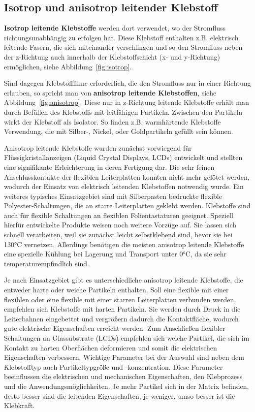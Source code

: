 \subsection{Isotrop und anisotrop leitender Klebstoff}

{\bf Isotrop leitende Klebstoffe} werden dort verwendet, wo der Stromfluss richtungsunabhängig zu erfolgen hat. Diese Klebstoff enthalten z.B. elektrisch leitende Fasern, die sich miteinander verschlingen und so den Stromfluss neben der z-Richtung auch innerhalb der Klebstoffschicht (x- und y-Richtung) ermöglichen, siehe Abbildung~\ref{fig:isotrop}.

Sind dagegen Klebstofffilme erforderlich, die den Stromfluss nur in einer Richtung erlauben, so spricht man von {\bf anisotrop leitende Klebstoffen}, siehe Abbildung~\ref{fig:anisotrop}. Diese nur in z-Richtung leitende Klebstoffe erhält man durch Befüllen des Klebstoffs mit leitfähigen Partikeln. Zwischen den Partikeln wirkt der Klebstoff als Isolator. So finden z.B. warmhärtende Klebstoffe Verwendung, die mit Silber-, Nickel, oder Goldpartikeln gefüllt sein können.

Anisotrop leitende Klebstoffe wurden zunächst vorwiegend für Flüssigkristallanzeigen (Liquid Crystal Displays, LCDs) entwickelt und stellten eine signifikante Erleichterung in deren Fertigung dar. Die sehr feinen Anschlusskontakte der flexiblen Leiterplatten konnten nicht mehr gelötet werden, wodurch der Einsatz von elektrisch leitenden Klebstoffen notwendig wurde. Ein weiteres typisches Einsatzgebiet sind mit Silberpasten bedruckte flexible Polyester-Schaltungen, die an starre Leiterplatten geklebt werden. Klebstoffe sind auch für flexible Schaltungen an flexiblen Folientastaturen geeignet. Speziell hierfür entwickelte Produkte weisen noch weitere Vorzüge auf. Sie lassen sich schnell verarbeiten, weil sie zunächst leicht selbstklebend sind, bevor sie bei 130°C vernetzen. Allerdings benötigen die meisten anisotrop leitende Klebstoffe eine spezielle Kühlung bei Lagerung und Transport unter 0°C, da sie sehr temperaturempfindlich sind.

Je nach Einsatzgebiet gibt es unterschiedliche anisotrop leitende Klebstoffe, die entweder harte oder weiche Partikeln enthalten. Soll eine flexible mit einer flexiblen oder eine flexible mit einer starren Leiterplatten verbunden werden, empfehlen sich Klebstoffe mit harten Partikeln. Sie werden durch Druck in die Leiterbahnen eingebettet und vergrößern dadurch die Kontaktfläche, wodurch gute elektrische Eigenschaften erreicht werden. Zum Anschließen flexibler Schaltungen an Glassubstrate (LCDs) empfehlen sich weiche Partikel, die sich im Kontakt zu harten Oberflächen deformieren und somit die elektrischen Eigenschaften verbessern. Wichtige Parameter bei der Auswahl sind neben dem Klebstofftyp auch Partikeltypgröße und -konzentration. Diese Parameter beeinflussen die elektrischen und mechanischen Eigenschaften, den Klebprozess und die Anwendungsmöglichkeiten. Je mehr Partikel sich in der Matrix befinden, desto besser sind die leitenden Eigenschaften, je weniger, umso besser ist die Klebkraft.


